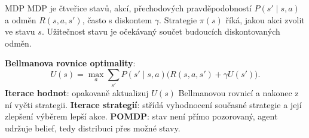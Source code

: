 \begin{defbox}{MDP}
MDP je čtveřice stavů, akcí, přechodových pravděpodobností $P(s'\mid s,a)$ a odměn $R(s,a,s')$, často s diskontem $\gamma$. Strategie $\pi(s)$ říká, jakou akci zvolit ve stavu $s$. Užitečnost stavu je očekávaný součet budoucích diskontovaných odměn.
\end{defbox}

\textbf{Bellmanova rovnice optimality}:
\[
U(s)=\max_a \sum_{s'} P(s'\mid s,a)\bigl(R(s,a,s')+\gamma U(s')\bigr).
\]
\textbf{Iterace hodnot}: opakovaně aktualizuj $U(s)$ Bellmanovou rovnicí a nakonec z ní vyčti strategii. \textbf{Iterace strategií}: střídá vyhodnocení současné strategie a její zlepšení výběrem lepší akce. \textbf{POMDP}: stav není přímo pozorovaný, agent udržuje belief, tedy distribuci přes možné stavy.

